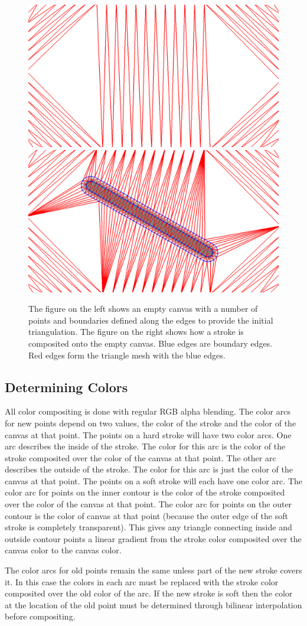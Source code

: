 \documentclass[review]{acmsiggraph}
\begin{document}
\begin{figure}
    \centering
        \includegraphics[width=.23\textwidth]{images/emptycanvas}
        \includegraphics[width=.23\textwidth]{images/canvaswithonestroke}
    \caption{The figure on the left shows an empty canvas with a number of points and boundaries defined along the edges
             to provide the initial triangulation. The figure on the right shows how a stroke is composited onto
             the empty canvas. Blue edges are boundary edges. Red edges form the triangle mesh with the blue edges.}
    \label{fig:firststrokes}
\end{figure}


\subsection{Determining Colors}
All color compositing is done with regular RGB alpha blending.  The color arcs for new points depend on two values, the color of the stroke and the color
of the canvas at that point. The points on a hard stroke will have two color arcs. One
arc describes the inside of the stroke. The color for this arc is the color of the stroke
composited over the color of the canvas at that point. The other arc describes the outside
of the stroke. The color for this arc is just the color of the canvas at that point. The
points on a soft stroke will each have one color arc. The color arc for points on the inner
contour is the color of the stroke composited over the color of the canvas at that point.
The color arc for points on the outer contour is the color of canvas at that point (because the outer edge of the soft stroke is completely transparent).
This gives any triangle connecting inside and outside contour points a linear gradient
from the stroke color composited over the canvas color to the canvas color.

The color arcs for old points remain the same unless part of the new stroke covers it.
In this case the colors in each arc must be replaced with the stroke color composited over
the old color of the arc. If the new stroke is soft then the color at the location of
the old point must be determined through bilinear interpolation before compositing.
\end{document}
